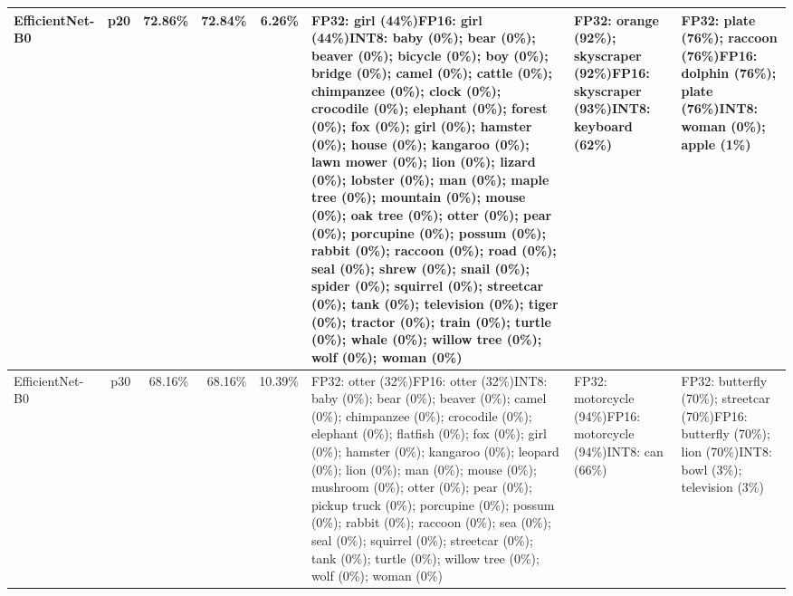 \begin{longtable}{p{2.8cm} r r r r p{5.0cm} p{4.2cm} p{4.2cm}}
EfficientNet-B0 & p20 & 72.86\% & 72.84\% & 6.26\% & FP32: girl (44\%)\newline FP16: girl (44\%)\newline INT8: baby (0\%); bear (0\%); beaver (0\%); bicycle (0\%); boy (0\%); bridge (0\%); camel (0\%); cattle (0\%); chimpanzee (0\%); clock (0\%); crocodile (0\%); elephant (0\%); forest (0\%); fox (0\%); girl (0\%); hamster (0\%); house (0\%); kangaroo (0\%); lawn mower (0\%); lion (0\%); lizard (0\%); lobster (0\%); man (0\%); maple tree (0\%); mountain (0\%); mouse (0\%); oak tree (0\%); otter (0\%); pear (0\%); porcupine (0\%); possum (0\%); rabbit (0\%); raccoon (0\%); road (0\%); seal (0\%); shrew (0\%); snail (0\%); spider (0\%); squirrel (0\%); streetcar (0\%); tank (0\%); television (0\%); tiger (0\%); tractor (0\%); train (0\%); turtle (0\%); whale (0\%); willow tree (0\%); wolf (0\%); woman (0\%) & FP32: orange (92\%); skyscraper (92\%)\newline FP16: skyscraper (93\%)\newline INT8: keyboard (62\%) & FP32: plate (76\%); raccoon (76\%)\newline FP16: dolphin (76\%); plate (76\%)\newline INT8: woman (0\%); apple (1\%) \\ \hline
EfficientNet-B0 & p30 & 68.16\% & 68.16\% & 10.39\% & FP32: otter (32\%)\newline FP16: otter (32\%)\newline INT8: baby (0\%); bear (0\%); beaver (0\%); camel (0\%); chimpanzee (0\%); crocodile (0\%); elephant (0\%); flatfish (0\%); fox (0\%); girl (0\%); hamster (0\%); kangaroo (0\%); leopard (0\%); lion (0\%); man (0\%); mouse (0\%); mushroom (0\%); otter (0\%); pear (0\%); pickup truck (0\%); porcupine (0\%); possum (0\%); rabbit (0\%); raccoon (0\%); sea (0\%); seal (0\%); squirrel (0\%); streetcar (0\%); tank (0\%); turtle (0\%); willow tree (0\%); wolf (0\%); woman (0\%) & FP32: motorcycle (94\%)\newline FP16: motorcycle (94\%)\newline INT8: can (66\%) & FP32: butterfly (70\%); streetcar (70\%)\newline FP16: butterfly (70\%); lion (70\%)\newline INT8: bowl (3\%); television (3\%) \\ \hline

\end{longtable}
